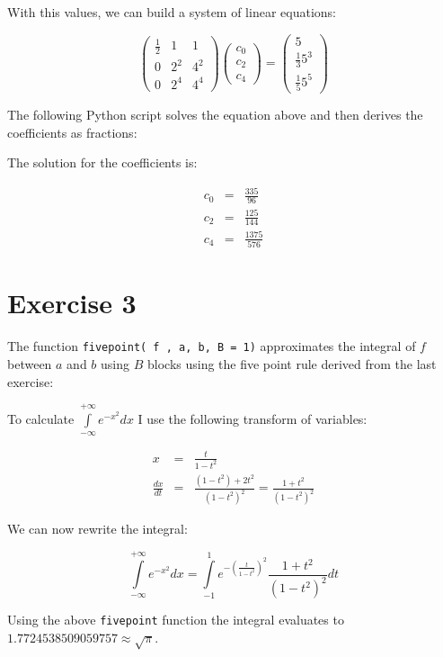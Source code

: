 \documentclass[%
]
{scrartcl}
\theoremstyle{plain}
\begin{document}
With this values, we can build a system of linear equations:

\begin{equation*}
\begin{pmatrix}\frac{1}{2}&1&1\\0&2^{2}&4^{2}\\0&2^{4}&4^{4}\end{pmatrix}\begin{pmatrix}c_{0}\\c_{2}\\c_{4}\end{pmatrix}=\begin{pmatrix}5\\\frac{1}{3}5^{3}\\\frac{1}{5}5^{5}\end{pmatrix}
\end{equation*}

The following Python script solves the equation above and then derives the coefficients as fractions:



The solution for the coefficients is:

\begin{eqnarray*}
c_{0}&=&\frac{335}{96}\\
c_{2}&=&\frac{125}{144}\\
c_{4}&=&\frac{1375}{576}
\end{eqnarray*}

\section*{Exercise 3}

The function \texttt{fivepoint( f , a, b, B = 1)} approximates the integral of $f$ between $a$ and $b$ using $B$ blocks using the five point rule derived from the last exercise:



To calculate $\int\limits_{-\infty}^{+\infty}e^{-x^{2}}dx$ I use the following transform of variables:

\begin{eqnarray*}
x&=&\frac{t}{1-t^{2}}\\
\frac{dx}{dt}&=&\frac{(1-t^{2})+2t^{2}}{(1-t^{2})^{2}}=\frac{1+t^{2}}{(1-t^{2})^{2}}
\end{eqnarray*}

We can now rewrite the integral:

\begin{equation*}
\int\limits_{-\infty}^{+\infty}e^{-x^{2}}dx=\int\limits_{-1}^{1}e^{-\left(\frac{t}{1-t^{2}}\right)^{2}}\frac{1+t^{2}}{(1-t^{2})^{2}}dt
\end{equation*}

Using the above \texttt{fivepoint} function the integral evaluates to $1.7724538509059757\approx\sqrt{\pi}$.

%
\end{document}
